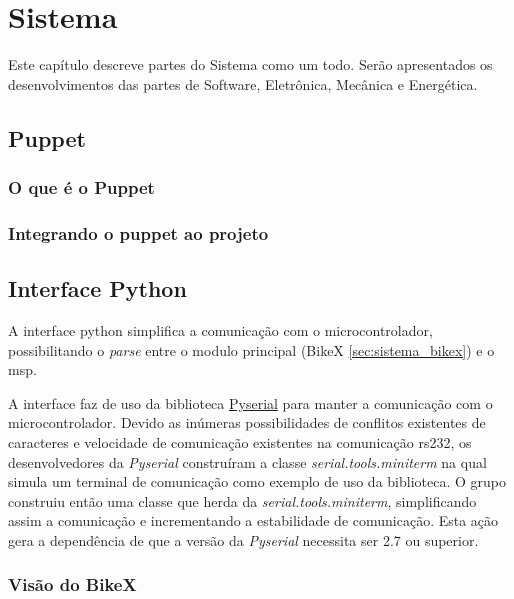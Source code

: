 
\chapter[Sistema]{Sistema}
Este capítulo descreve partes do Sistema como um todo. Serão apresentados os desenvolvimentos das partes de Software, Eletrônica, Mecânica e Energética. 


\section{Puppet} %
\label{sec:puppet}

\subsection{O que é o Puppet} %
\label{sub:o_que_o_puppet}

\subsection{Integrando o puppet ao projeto} %
\label{sub:integrando_o_puppet_ao_projeto}


\section{Interface Python} %
\label{sec:interface_python}

A interface \gls{python} simplifica a comunicação com o microcontrolador, possibilitando o \textit{parse} entre o modulo principal (BikeX \ref{sec:sistema_bikex}) e o \gls{msp}.

A interface faz de uso da biblioteca \href{http://pyserial.sourceforge.net/pyserial.html}{Pyserial} para manter a comunicação com o microcontrolador. Devido as inúmeras possibilidades de conflitos existentes de caracteres e velocidade de comunicação existentes na comunicação \gls{rs232}, os desenvolvedores da \textit{Pyserial} construíram a classe \textit{serial.tools.miniterm} na qual simula um terminal de comunicação como exemplo de uso da biblioteca. O grupo construiu então uma classe que herda da \textit{serial.tools.miniterm}, simplificando assim a comunicação e incrementando a estabilidade de comunicação. Esta ação gera a dependência de que a versão da \textit{Pyserial} necessita ser 2.7 ou superior.

\subsection{Visão do BikeX} %
\label{sub:vis_o_do_bikex}

